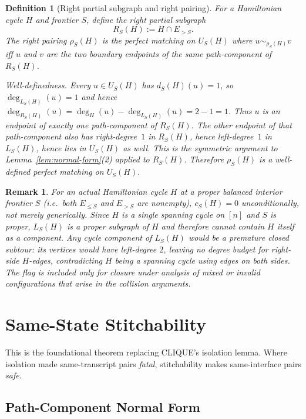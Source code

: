 \documentclass[11pt]{article}
\newtheorem{definition}[theorem]{Definition}
\newtheorem{remark}[theorem]{Remark}
\begin{document}
\begin{definition}[Right partial subgraph and right pairing]
\label{def:right-pairing}
For a Hamiltonian cycle $H$ and frontier $S$, define the \emph{right partial subgraph}
\[
  R_S(H) := H \cap E_{>S}.
\]
The \emph{right pairing} $\rho_S(H)$ is the perfect matching on $U_S(H)$ where
$u \sim_{\rho_S(H)} v$ iff $u$ and $v$ are the two boundary endpoints of the same
path-component of $R_S(H)$.

\smallskip
\noindent\textit{Well-definedness.}
Every $u \in U_S(H)$ has $d_S(H)(u) = 1$, so $\deg_{L_S(H)}(u) = 1$ and hence
$\deg_{R_S(H)}(u) = \deg_H(u) - \deg_{L_S(H)}(u) = 2 - 1 = 1$.
Thus $u$ is an endpoint of exactly one path-component of $R_S(H)$.
The other endpoint of that path-component also has right-degree~$1$ in $R_S(H)$,
hence left-degree~$1$ in $L_S(H)$, hence lies in $U_S(H)$ as well.
This is the symmetric argument to Lemma~\ref{lem:normal-form}(2) applied to $R_S(H)$.
Therefore $\rho_S(H)$ is a well-defined perfect matching on $U_S(H)$.
\end{definition}

\begin{remark}
\label{rem:premature-cycle}
For an actual Hamiltonian cycle $H$ at a proper balanced interior
frontier $S$ (i.e.\ both $E_{\le S}$ and $E_{> S}$ are nonempty),
$c_S(H) = 0$ unconditionally, not merely generically.
Since $H$ is a single spanning cycle on $[n]$ and $S$ is proper,
$L_S(H)$ is a proper subgraph of $H$ and therefore cannot contain
$H$ itself as a component.  Any cycle component of $L_S(H)$ would
be a premature closed subtour: its vertices would have left-degree
$2$, leaving no degree budget for right-side $H$-edges, contradicting
$H$ being a spanning cycle using edges on both sides.
The flag is included only for closure under analysis of mixed or
invalid configurations that arise in the collision arguments.
\end{remark}


\section{Same-State Stitchability}
\label{sec:stitchability}

This is the foundational theorem replacing CLIQUE's
isolation lemma.  Where isolation made same-transcript
pairs \emph{fatal}, stitchability makes same-interface
pairs \emph{safe}.

\subsection{Path-Component Normal Form}
\end{document}
